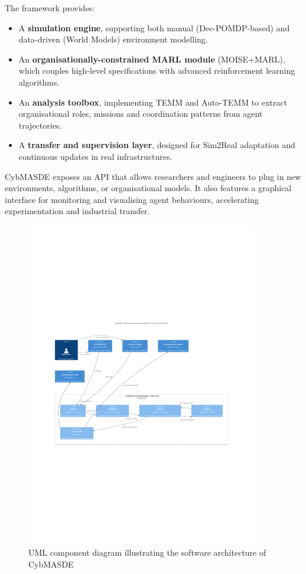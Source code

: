 \documentclass[a4paper,10pt,twocolumn]{article}
\begin{document}
The framework provides:
\begin{itemize}
    \item A \textbf{simulation engine}, supporting both manual
          (Dec-POMDP-based) and data-driven (World Models) environment modelling.
    \item An \textbf{organisationally-constrained MARL module}
          (MOISE+MARL), which couples high-level specifications with advanced
          reinforcement learning algorithms.
    \item An \textbf{analysis toolbox}, implementing TEMM and Auto-TEMM
          to extract organisational roles, missions and coordination patterns
          from agent trajectories.
    \item A \textbf{transfer and supervision layer}, designed for Sim2Real
          adaptation and continuous updates in real infrastructures.
\end{itemize}

CybMASDE exposes an API that allows researchers and engineers to plug in
new environments, algorithms, or organisational models. It also features
a graphical interface for monitoring and visualising agent behaviours,
accelerating experimentation and industrial transfer.

\begin{figure}
    \centering
    \includegraphics[trim={2.25cm 9cm 2.25cm 10cm},clip,width=0.9\textwidth]{figures/CybMASDE_internal_component_diagram.pdf}
    \caption{UML component diagram illustrating the software architecture of CybMASDE}
    \label{fig:cybmasde_uml}
\end{figure}
\end{document}
